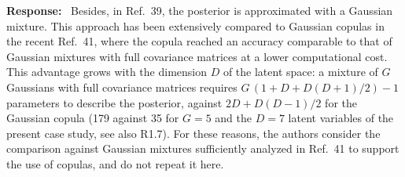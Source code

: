 \documentclass[11pt]{article}
\newenvironment{response}{\par\smallskip\noindent\color{resp}\textbf{Response:}\ }{\par}
\newcommand{\m}{\mathbf{m}}
\newcommand{\z}{\mathbf{z}}
\begin{document}
\begin{response}
Besides, in Ref.~39, the posterior is approximated with a Gaussian mixture. This approach has been extensively compared to Gaussian copulas in the recent Ref.~41, where the copula reached an accuracy comparable to that of Gaussian mixtures with full covariance matrices at a lower computational cost.	This advantage grows with the dimension $D$ of the latent space: a mixture of $G$ Gaussians with full covariance matrices requires $G\,(1+D+D(D+1)/2)-1$ parameters to describe the posterior, against $2D+D(D-1)/2$ for the Gaussian copula (179 against 35 for $G=5$ and the $D=7$ latent variables of the present case study, see also R1.7).
For these reasons, the authors consider the comparison against Gaussian mixtures sufficiently analyzed in Ref.~41 to support the use of copulas, and do not repeat it here.




\end{response}
\end{document}
